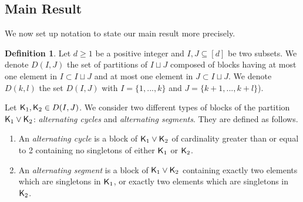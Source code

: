 \documentclass[11pt, a4paper, oneside, reqno]{amsart}
\newcommand{\sK}{{\sf K}}
\newcommand{\setK}{{D(I,J)}}
\newcommand{\partitionskl}{{D(k,l)}}
\theoremstyle{remark}
\theoremstyle{definition}
\newtheorem{definition}[theorem]{Definition}
\numberwithin{equation}{section}
\begin{document}
\subsection{Main Result}
\label{sec:MainResult}
We now set up notation to state our main result more precisely.
\begin{definition}
	\label{def:cycleszizgzag} Let $d \geq 1$ be a positive integer and $I,J \subseteq [d]$ be two subsets.
	We denote $\setK$ the set of partitions of $I \sqcup J$ composed of blocks having at most one element in $I \subset I \sqcup J$ and at most one element in $J \subset I \sqcup J$.
	We denote $\partitionskl$ the set $D(I,J)$ with $I = \{1,...,k\}$ and $J = \{k+1,...,k+l\}$).
\end{definition}
Let $\sK_1, \sK_2 \in \setK$. We consider two different types of blocks of the partition $\sK_1 \vee \sK_2$:
\emph{alternating cycles} and \emph{alternating segments}. They are defined as follows.
\begin{enumerate}
    \item An \emph{alternating cycle} is a block of $\sK_1 \vee \sK_2$ of cardinality greater than or equal to 2 containing no singletons of either $\sK_1$ or $\sK_2$.

    \item  An \emph{alternating segment} is a block of $\sK_1 \vee \sK_2$ containing
      exactly two elements which are singletons in $\sK_1$, or exactly two elements
      which are singletons in $\sK_2$. 


\end{enumerate}
\end{document}
